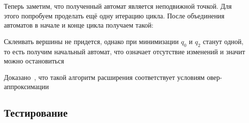 Теперь заметим, что полученный автомат является неподвижной точкой. Для этого попробуем проделать ещё одну итерацию цикла. После объединения автоматов в начале и конце цикла получаем такой:

\begin{figure}[h]
    \centering
\end{figure}

Склеивать вершины не придется, однако при минимизации $q_0$ и $q_2$ станут одной, то есть получим начальный автомат, что означает отсутствие изменений и значит можно остановиться 

Доказано~\cite{widening}, что такой алгоритм расширения соответствует условиям овер-аппроксимации


\newpage
\subsection{Тестирование}
